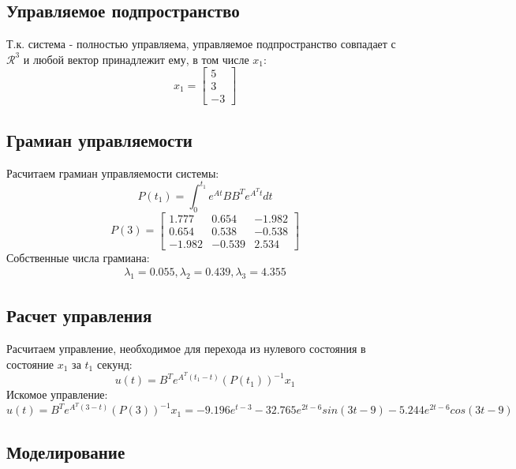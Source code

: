 \subsection{Управляемое подпространство}
Т.к. система - полностью управляема, управляемое подпространство совпадает с $\mathcal{R}^3$ и любой вектор
принадлежит ему, в том числе $x_1$:
\begin{equation*}
    x_1 = \begin{bmatrix}
        5 \\
        3 \\
        -3
    \end{bmatrix}
\end{equation*}

\subsection{Грамиан управляемости}
Расчитаем грамиан управляемости системы:
\begin{equation}
    P(t_1) = \int_{0}^{t_1}e^{At}BB^Te^{A^Tt}dt
\end{equation}
\begin{equation*}
    P(3) = \begin{bmatrix}
        1.777 & 0.654 & -1.982 \\
        0.654 & 0.538 & -0.538 \\
        -1.982 & -0.539 & 2.534
        \end{bmatrix}
\end{equation*}
Собственные числа грамиана:
\begin{eqnarray*}
    \lambda_1 = 0.055, \lambda_2 = 0.439, \lambda_3 = 4.355
\end{eqnarray*}

\subsection{Расчет управления}
Расчитаем управление, необходимое для перехода из нулевого состояния в состояние $x_1$ за $t_1$ секунд:
\begin{equation}
    u(t) = B^Te^{A^T(t_1-t)}(P(t_1))^{-1}x_1
\end{equation}
Искомое управление:
\begin{equation*}
    u(t) = B^Te^{A^T(3-t)}(P(3))^{-1}x_1 = -9.196e^{t-3} - 32.765e^{2t-6}sin(3t-9)-5.244e^{2t-6}cos(3t-9)
\end{equation*}

\subsection{Моделирование}
